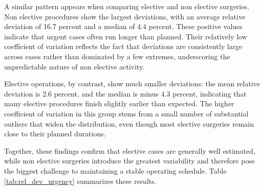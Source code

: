 \documentclass[
]{article}
\begin{document}
A similar pattern appears when comparing elective and non elective
surgeries. Non elective procedures show the largest deviations, with an
average relative deviation of 16.7 percent and a median of 4.4 percent.
These positive values indicate that urgent cases often run longer than
planned. Their relatively low coefficient of variation reflects the fact
that deviations are consistently large across cases rather than
dominated by a few extremes, underscoring the unpredictable nature of
non elective activity.

Elective operations, by contrast, show much smaller deviations: the mean
relative deviation is 2.6 percent, and the median is minus 4.3 percent,
indicating that many elective procedures finish slightly earlier than
expected. The higher coefficient of variation in this group stems from a
small number of substantial outliers that widen the distribution, even
though most elective surgeries remain close to their planned durations.

Together, these findings confirm that elective cases are generally well
estimated, while non elective surgeries introduce the greatest
variability and therefore pose the biggest challenge to maintaining a
stable operating schedule. Table \ref{tab:rel_dev_urgency} summarizes
these results.
\end{document}
